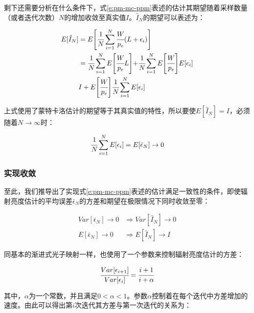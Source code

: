 剩下还需要分析在什么条件下，式\ref{e:pm-mc-ppm}表述的估计其期望随着采样数量（或者迭代次数）$N$的增加收敛至真实值$I$。$\hat{I}_N$的期望可以表述为：

\begin{equation}
\begin{aligned}
	E[\hat{I}_N]&=E\Biggl[  \cfrac{1}{N}\sum^{N}_{i=1} \cfrac{W}{p_e}(L+\epsilon_i) \Biggl]\\
	&= \cfrac{1}{N}\sum^{N}_{i=1}E\Biggl[ \cfrac{W}{p_e}L\Biggl]+  \cfrac{1}{N}\sum^{N}_{i=1}E\Biggl[ \cfrac{W}{p_e}\Biggl]E[\epsilon_i]\\
	&I+E\Biggl[ \cfrac{W}{p_e}\Biggl] \cfrac{1}{N}\sum^{N}_{i=1}E[\epsilon_i]
\end{aligned}
\end{equation}

上式使用了蒙特卡洛估计的期望等于其真实值的特性，所以要使$E[\hat{I}_N]=I$，必须随着$N\to\infty$时：

\begin{equation}
	 \cfrac{1}{N}\sum^{N}_{i=1}E[\epsilon_i]=E[\bar{\epsilon}_N]\to 0
\end{equation}





\subsubsection{实现收敛}
至此，我们推导出了实现式\ref{e:pm-mc-ppm}表述的估计满足一致性的条件，即使辐射亮度估计的平均误差$\bar{\epsilon}_N$的方差和期望在极限情况下同时收敛至零：

\begin{equation}\label{e:pm-consistent}
	\begin{aligned}
		Var[\bar{\epsilon}_N]\to 0 &\Rightarrow Var[\hat{I}_N]\to 0\\
		E[\bar{\epsilon}_N]\to 0 &\Rightarrow E[\hat{I}_N]\to I
	\end{aligned}
\end{equation}

同基本的渐进式光子映射一样，\cite{a:ProgressivePhotonMappingAProbabilisticApproach}也使用了一个参数来控制辐射亮度估计的方差：

\begin{equation}
	 \cfrac{Var[\epsilon_{i+1}]}{Var[\epsilon_i]}= \cfrac{i+1}{i+\alpha}
\end{equation}

\noindent 其中，$\alpha$为一个常数，并且满足$0<\alpha<1$。参数$\alpha$控制着在每个迭代中方差增加的速度。由此可以得出第$i$次迭代其方差与第一次迭代的关系为：

